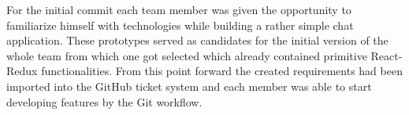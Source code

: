 For the initial commit each team member was given the opportunity to familiarize himself with technologies while building a rather simple chat application. These prototypes served as candidates for the initial version of the whole team from which one got selected which already contained primitive React-Redux functionalities. From this point forward the created requirements had been imported into the GitHub ticket system and each member was able to start developing features by the Git workflow.
